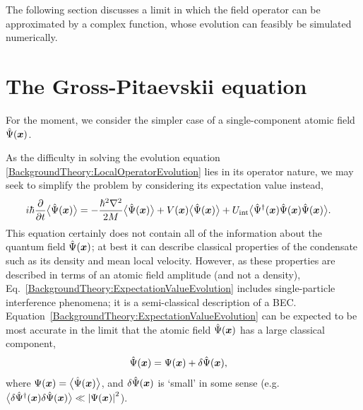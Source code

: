 The following section discusses a limit in which the field operator can be approximated by a complex function, whose evolution can feasibly be simulated numerically.

\section{The Gross-Pitaevskii equation}
\label{BackgroundTheory:GrossPitaevskiiEquation}

For the moment, we consider the simpler case of a single-component atomic field $\hat{\Psi}(\bm{x})$.

As the difficulty in solving the evolution equation \eqref{BackgroundTheory:LocalOperatorEvolution} lies in its operator nature, we may seek to simplify the problem by considering its expectation value instead,
\begin{align}
    i \hbar \frac{\partial}{\partial t} \mean{\hat{\Psi}(\vect{x})} &= - \frac{\hbar^2 \nabla^2}{2 M} \mean{\hat{\Psi}(\vect{x})} + V(\vect{x})\mean{\hat{\Psi}(\vect{x})} + U_\text{int} \mean{\hat{\Psi}^\dagger (\vect{x}) \hat{\Psi}(\vect{x}) \hat{\Psi}(\vect{x})}. \label{BackgroundTheory:ExpectationValueEvolution}
\end{align}
This equation certainly does not contain all of the information about the quantum field $\hat{\Psi}(\bm{x})$; at best it can describe classical properties of the condensate such as its density and mean local velocity.  However, as these properties are described in terms of an atomic field amplitude (and not a density), Eq.~\eqref{BackgroundTheory:ExpectationValueEvolution} includes single-particle interference phenomena; it is a semi-classical description of a BEC. Equation~\eqref{BackgroundTheory:ExpectationValueEvolution} can be expected to be most accurate in the limit that the atomic field $\hat{\Psi}(\bm{x})$ has a large classical component,
\begin{align}
    \hat{\Psi}(\vect{x}) &= \Psi(\vect{x}) + \delta\hat{\Psi}(\vect{x}), \label{BackgroundTheory:FieldOperatorDecomposition}
\end{align}
where $\Psi(\bm{x}) = {\big<\hat{\Psi}(\bm{x})\big>}$, and $\delta\hat{\Psi}(\bm{x})$ is `small' in some sense (e.g. ${\big<\delta\hat{\Psi}^\dagger(\bm{x}) \delta\hat{\Psi}(\bm{x})\big>} \ll \left|\Psi(\bm{x})\right|^2$).

